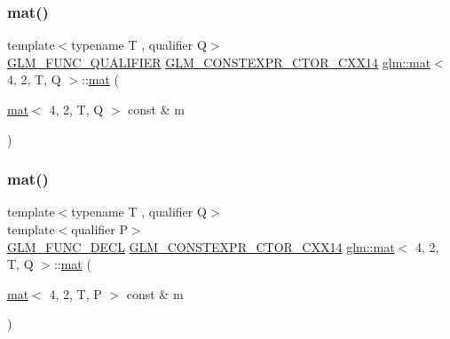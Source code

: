 \subsubsection{\texorpdfstring{mat()}{mat()}\hspace{0.1cm}{\footnotesize\ttfamily [2/21]}}
{\footnotesize\ttfamily template$<$typename T , qualifier Q$>$ \\
\mbox{\hyperlink{setup_8hpp_a33fdea6f91c5f834105f7415e2a64407}{G\+L\+M\+\_\+\+F\+U\+N\+C\+\_\+\+Q\+U\+A\+L\+I\+F\+I\+ER}} \mbox{\hyperlink{setup_8hpp_a0900f9145e68bf6061b6f5e7be3fa751}{G\+L\+M\+\_\+\+C\+O\+N\+S\+T\+E\+X\+P\+R\+\_\+\+C\+T\+O\+R\+\_\+\+C\+X\+X14}} \mbox{\hyperlink{structglm_1_1mat}{glm\+::mat}}$<$ 4, 2, T, Q $>$\+::\mbox{\hyperlink{structglm_1_1mat}{mat}} (\begin{DoxyParamCaption}\item[{\mbox{\hyperlink{structglm_1_1mat}{mat}}$<$ 4, 2, T, Q $>$ const \&}]{m }\end{DoxyParamCaption})}

\mbox{\label{structglm_1_1mat_3_014_00_012_00_01_t_00_01_q_01_4_ad435b5f1f4b1647655ec65a9a8517e20}} 
\subsubsection{\texorpdfstring{mat()}{mat()}\hspace{0.1cm}{\footnotesize\ttfamily [3/21]}}
{\footnotesize\ttfamily template$<$typename T , qualifier Q$>$ \\
template$<$qualifier P$>$ \\
\mbox{\hyperlink{setup_8hpp_ab2d052de21a70539923e9bcbf6e83a51}{G\+L\+M\+\_\+\+F\+U\+N\+C\+\_\+\+D\+E\+CL}} \mbox{\hyperlink{setup_8hpp_a0900f9145e68bf6061b6f5e7be3fa751}{G\+L\+M\+\_\+\+C\+O\+N\+S\+T\+E\+X\+P\+R\+\_\+\+C\+T\+O\+R\+\_\+\+C\+X\+X14}} \mbox{\hyperlink{structglm_1_1mat}{glm\+::mat}}$<$ 4, 2, T, Q $>$\+::\mbox{\hyperlink{structglm_1_1mat}{mat}} (\begin{DoxyParamCaption}\item[{\mbox{\hyperlink{structglm_1_1mat}{mat}}$<$ 4, 2, T, P $>$ const \&}]{m }\end{DoxyParamCaption})}

\mbox{\label{structglm_1_1mat_3_014_00_012_00_01_t_00_01_q_01_4_a43859796c0a085cc08c02af0ac5bfad7}} 
